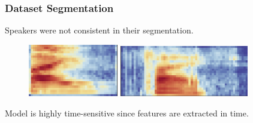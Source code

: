 \documentclass{beamer}
\begin{document}
\begin{frame}
  \frametitle{Dataset Segmentation}
  Speakers were not consistent in their segmentation.
  \begin{figure}[h]
    \centering
    \includegraphics[width=0.35\textwidth]{img/george_5.png}
    \hfill
    \includegraphics[width=0.5\textwidth]{img/lucas_5.png}
  \end{figure}

  Model is highly time-sensitive since features are extracted in time.
\end{frame}
\end{document}
